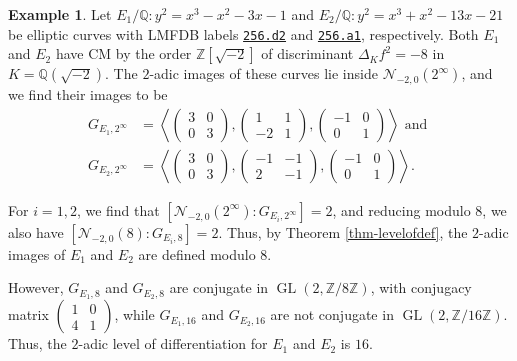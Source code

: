 \documentclass[11pt]{amsart}
\theoremstyle{definition}
\newtheorem{example}[defn]{Example}
\newcommand{\Q}{\mathbb{Q}}
\newcommand{\Z}{\mathbb{Z}}
\newcommand{\GL}{\operatorname{GL}}
\newcommand{\eclabel}[1]{\href{https://www.lmfdb.org/EllipticCurve/Q/#1}{\texttt{#1}}}
\begin{document}
\begin{example}
    Let $E_1/\Q : y^2=x^3-x^2-3x-1$ and $E_2/\Q : y^2=x^3+x^2-13x-21$ be elliptic curves with LMFDB labels \eclabel{256.d2} and \eclabel{256.a1}, respectively. Both $E_1$ and $E_2$ have CM by the order $\Z[\sqrt{-2}]$ of discriminant $\Delta_K f^2 = -8$ in $K = \Q(\sqrt{-2})$. The $2$-adic images of these curves lie inside $\mathcal{N}_{-2,0}(2^{\infty})$, and we find their images to be
    \begin{align*}  G_{E_1, 2^{\infty}} &= \left\langle 
    \left( \begin{array}{cc} 3 & 0 \\ 0 & 3 \end{array} \right),
    \left( \begin{array}{cc} 1 & 1 \\ -2 & 1 \end{array} \right),
    \left( \begin{array}{cc} -1 & 0 \\ 0 & 1 \end{array} \right) \right\rangle \text{ and }\\
    G_{E_2, 2^{\infty}} &= \left\langle 
    \left( \begin{array}{cc} 3 & 0 \\ 0 & 3 \end{array} \right),
    \left( \begin{array}{cc} -1 & -1 \\ 2 & -1 \end{array} \right),
    \left( \begin{array}{cc} -1 & 0 \\ 0 & 1 \end{array} \right) \right\rangle.
    \end{align*}

    For $i = 1, 2$, we find that $[\mathcal{N}_{-2, 0}(2^{\infty}) : G_{E_i, 2^{\infty}}] = 2$, and reducing modulo $8$, we also have $[\mathcal{N}_{-2, 0}(8) : G_{E_i, 8}] = 2$. Thus, by Theorem \ref{thm-levelofdef}, the $2$-adic images of $E_1$ and $E_2$ are defined modulo $8$.

    However, $G_{E_1, 8}$ and $G_{E_2, 8}$ are conjugate in $\GL(2,\Z/8\Z)$, with conjugacy matrix $\left( \begin{array}{cc} 1 & 0 \\ 4 & 1 \end{array} \right)$, while $G_{E_1, 16}$ and $G_{E_2, 16}$ are not conjugate in $\GL(2, \Z/16\Z)$. Thus, the $2$-adic level of differentiation for $E_1$ and $E_2$ is $16$.
\end{example}
\end{document}
